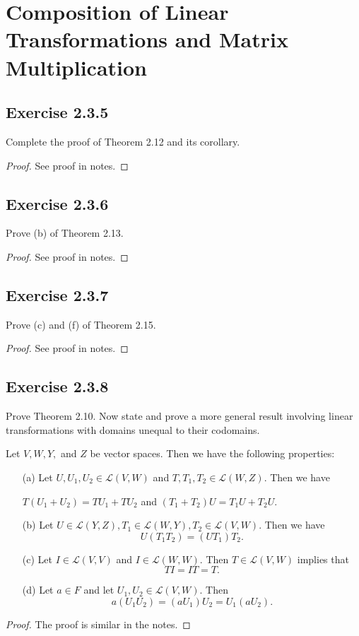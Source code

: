 \section{Composition of Linear Transformations and Matrix Multiplication}


\subsection*{Exercise 2.3.5} Complete the proof of Theorem 2.12 and its corollary. 
\begin{proof}
See proof in notes.
\end{proof}

\subsection*{Exercise 2.3.6} Prove (b) of Theorem 2.13.
\begin{proof}
See proof in notes.
\end{proof}

\subsection*{Exercise 2.3.7} Prove (c) and (f) of Theorem 2.15.
\begin{proof}
See proof in notes.
\end{proof}

\subsection*{Exercise 2.3.8} Prove Theorem 2.10. Now state and prove a more general result involving linear transformations with domains unequal to their codomains.
\begin{prop}
    Let \( V , W, Y,  \) and \( Z  \) be vector spaces. Then we have the following properties:
    \begin{enumerate}
        \item[(a)] Let \( U, {U}_{1}, {U}_{2} \in \mathcal{L}(V,W)  \) and \( T, {T}_{1}, {T}_{2} \in \mathcal{L}(W,Z) \). Then we have
            \begin{center}
                \( T({U}_{1} + {U}_{2}) = {TU}_{1} + {TU}_{2}  \) and \( ({T}_{1} + {T}_{2}) U = {T}_{1} U + {T}_{2} U  \).
            \end{center}
        \item[(b)] Let \( U \in \mathcal{L}(Y,Z),  {T}_{1} \in \mathcal{L}(W,Y) , {T}_{2} \in \mathcal{L}(V,W)   \). Then we have
            \[  U({T}_{1} {T}_{2}) = (U {T}_{1}){T}_{2}. \]
        \item[(c)] Let \( I \in \mathcal{L}(V,V)  \) and \( I \in \mathcal{L}(W,W)  \). Then \( T \in \mathcal{L}(V,W)  \) implies that 
            \[  TI = IT = T. \]
        \item[(d)] Let \( a \in F  \) and let \( {U}_{1}, {U}_{2} \in \mathcal{L}(V,W) \). Then
            \[  a({U}_{1} {U}_{2}) = ({aU}_{1}) {U}_{2} = {U}_{1} ({aU}_{2}). \]
    \end{enumerate}
\end{prop}
\begin{proof}
The proof is similar in the notes.
\end{proof}

